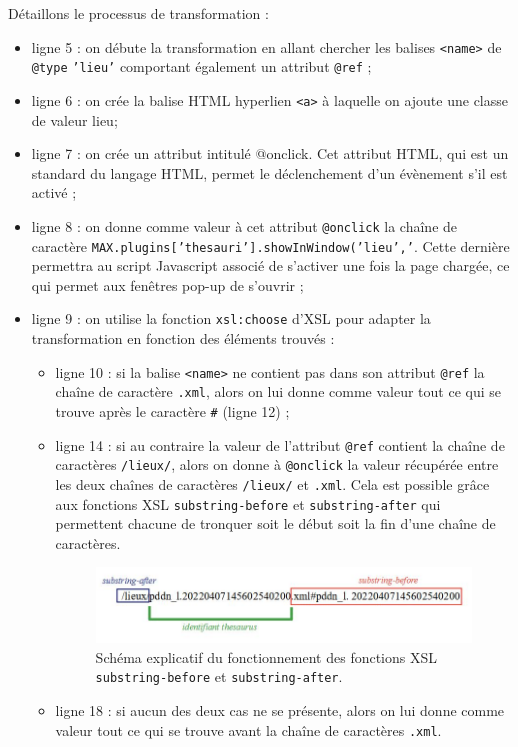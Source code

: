 \documentclass[a4paper,12pt,twoside]{book}
\begin{document}
Détaillons le processus de transformation \label{thesau_xsl}:
\begin{itemize}
    \item ligne 5 : on débute la transformation en allant chercher les balises \texttt{<name>} de \texttt{@type} \texttt{'lieu'} comportant également un attribut \texttt{@ref} ;
    \item ligne 6 : on crée la balise \acrshort{HTML} hyperlien \texttt{<a>} à laquelle on ajoute une classe de valeur \og lieu\fg ;
    \item ligne 7 : on crée un attribut intitulé @onclick. Cet attribut \acrshort{HTML}, qui est un standard du langage \acrshort{HTML}, permet le déclenchement d'un évènement s'il est activé ;
    \item ligne 8 : on donne comme valeur à cet attribut \texttt{@onclick} la chaîne de caractère \og \texttt{MAX.plugins['thesauri'].showInWindow('lieu','}\fg. Cette dernière permettra au script Javascript associé de s'activer une fois la page chargée, ce qui permet aux fenêtres pop-up de s'ouvrir ;
    \item ligne 9 : on utilise la fonction \texttt{xsl:choose} d'\acrshort{XSL} pour adapter la transformation en fonction des éléments trouvés :
    \begin{itemize}
    \item ligne 10 : si la balise \texttt{<name>} ne contient pas dans son attribut \texttt{@ref} la chaîne de caractère \texttt{.xml}, alors on lui donne comme valeur tout ce qui se trouve après le caractère \texttt{\#} (ligne 12) ;
    \item ligne 14 : si au contraire la valeur de l'attribut \texttt{@ref} contient la chaîne de caractères \texttt{/lieux/}, alors on donne à \texttt{@onclick} la valeur récupérée entre les deux chaînes de caractères \texttt{/lieux/} et \texttt{.xml}. Cela est possible grâce aux fonctions \acrshort{XSL} \texttt{substring-before} et \texttt{substring-after} qui permettent chacune de tronquer soit le début soit la fin d'une chaîne de caractères.
    
    \begin{figure}[H]
        \centering
        \includegraphics[width=13cm]{img/partie_3/lundey_thesau.JPG}
        \caption{Schéma explicatif du fonctionnement des fonctions \acrshort{XSL} \texttt{substring-before} et \texttt{substring-after}.}
    \end{figure}
    
    \item ligne 18 : si aucun des deux cas ne se présente, alors on lui donne comme valeur tout ce qui se trouve avant la chaîne de caractères \texttt{.xml}.
    \end{itemize}
\end{itemize}
\end{document}
